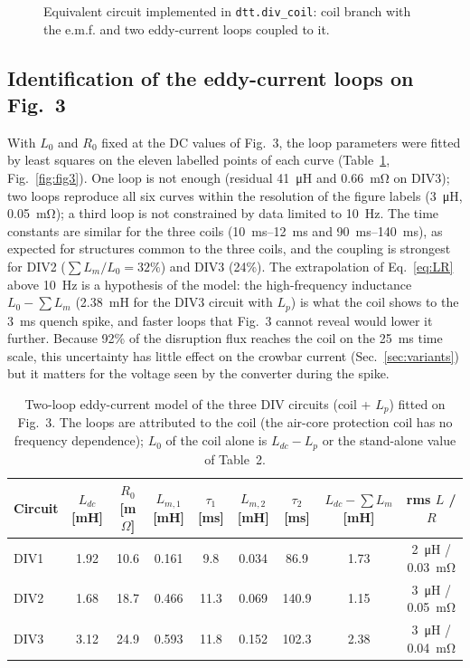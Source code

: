 \documentclass[11pt,a4paper]{article}
\newcommand{\code}[1]{\texttt{#1}}
\begin{document}
\begin{figure}[htbp]
\centering

\caption{Equivalent circuit implemented in \code{dtt.div\_coil}: coil branch with the e.m.f. and two eddy-current loops coupled to it.}
\label{fig:model}
\end{figure}

\subsection{Identification of the eddy-current loops on Fig.~3}
\label{sec:eddy}
With $L_0$ and $R_0$ fixed at the DC values of Fig.~3, the loop parameters were fitted by least squares on the eleven labelled points of each curve (Table~\ref{tab:eddy}, Fig.~\ref{fig:fig3}). One loop is not enough (residual \SI{41}{\micro\henry} and \SI{0.66}{\milli\ohm} on DIV3); two loops reproduce all six curves within the resolution of the figure labels (\SI{3}{\micro\henry}, \SI{0.05}{\milli\ohm}); a third loop is not constrained by data limited to \SI{10}{\hertz}. The time constants are similar for the three coils (\SIrange{10}{12}{\milli\second} and \SIrange{90}{140}{\milli\second}), as expected for structures common to the three coils, and the coupling is strongest for DIV2 ($\sum L_m / L_0 = 32\%$) and DIV3 (24\%). The extrapolation of Eq.~\eqref{eq:LR} above \SI{10}{\hertz} is a hypothesis of the model: the high-frequency inductance $L_0 - \sum L_m$ (\SI{2.38}{\milli\henry} for the DIV3 circuit with $L_p$) is what the coil shows to the \SI{3}{\milli\second} quench spike, and faster loops that Fig.~3 cannot reveal would lower it further. Because 92\% of the disruption flux reaches the coil on the \SI{25}{\milli\second} time scale, this uncertainty has little effect on the crowbar current (Sec.~\ref{sec:variants}) but it matters for the voltage seen by the converter during the spike.

\begin{table}[htbp]
\centering\small
\caption{Two-loop eddy-current model of the three DIV circuits (coil + $L_p$) fitted on \cite{enea_spec} Fig.~3. The loops are attributed to the coil (the air-core protection coil has no frequency dependence); $L_0$ of the coil alone is $L_{dc} - L_p$ or the stand-alone value of Table~2.}
\label{tab:eddy}
\footnotesize
\begin{tabular}{@{}lcccccccc@{}}
\toprule
Circuit & $L_{dc}$ [mH] & $R_0$ [m$\Omega$] & $L_{m,1}$ [mH] & $\tau_1$ [ms] & $L_{m,2}$ [mH] & $\tau_2$ [ms] & $L_{dc}-\sum L_m$ [mH] & rms $L$ / $R$\\
\midrule
DIV1 & 1.92 & 10.6 & 0.161 & 9.8 & 0.034 & 86.9 & 1.73 & \SI{2}{\micro\henry} / \SI{0.03}{\milli\ohm}\\
DIV2 & 1.68 & 18.7 & 0.466 & 11.3 & 0.069 & 140.9 & 1.15 & \SI{3}{\micro\henry} / \SI{0.05}{\milli\ohm}\\
DIV3 & 3.12 & 24.9 & 0.593 & 11.8 & 0.152 & 102.3 & 2.38 & \SI{3}{\micro\henry} / \SI{0.04}{\milli\ohm}\\
\bottomrule
\end{tabular}
\end{table}
\end{document}
